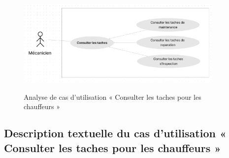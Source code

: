 \begin{figure}[h!]
  \centering
  \includegraphics[width=0.9\textwidth,height=5cm]{chap4.images/raf consulter chauf.png}
  \caption{Analyse de cas d’utilisation « Consulter les taches pour les chauffeurs »}

\end{figure}

\subsection{Description textuelle du cas d’utilisation « Consulter les taches pour les chauffeurs »}

